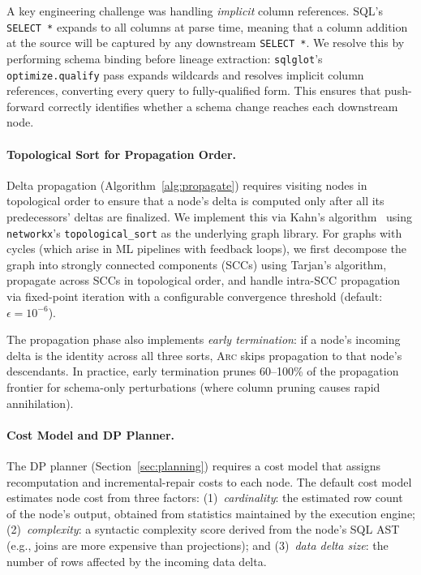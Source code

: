 \documentclass[sigplan,screen,nonacm]{acmart}
\newcommand{\arc}{\textsc{Arc}\xspace}
\begin{document}
A key engineering challenge was handling \emph{implicit} column
references.  SQL's \texttt{SELECT *} expands to all columns at parse
time, meaning that a column addition at the source will be captured by
any downstream \texttt{SELECT *}.  We resolve this by performing schema
binding before lineage extraction: \texttt{sqlglot}'s
\texttt{optimize.qualify} pass expands wildcards and resolves implicit
column references, converting every query to fully-qualified form.
This ensures that push-forward correctly identifies whether a schema
change reaches each downstream node.

\paragraph{Topological Sort for Propagation Order.}
Delta propagation (Algorithm~\ref{alg:propagate}) requires visiting
nodes in topological order to ensure that a node's delta is computed
only after all its predecessors' deltas are finalized.  We implement
this via Kahn's algorithm~\cite{kahn1962topological} using
\texttt{networkx}'s \texttt{topological\_sort} as the underlying
graph library.  For graphs with cycles (which arise in ML pipelines
with feedback loops), we first decompose the graph into strongly
connected components (SCCs) using Tarjan's algorithm, propagate
across SCCs in topological order, and handle intra-SCC propagation
via fixed-point iteration with a configurable convergence threshold
(default: $\epsilon = 10^{-6}$).

The propagation phase also implements \emph{early termination}: if a
node's incoming delta is the identity across all three sorts, \arc
skips propagation to that node's descendants.  In practice, early
termination prunes 60--100\% of the propagation frontier for
schema-only perturbations (where column pruning causes rapid
annihilation).

\paragraph{Cost Model and DP Planner.}
The DP planner (Section~\ref{sec:planning}) requires a cost model
that assigns recomputation and incremental-repair costs to each node.
The default cost model estimates node cost from three factors:
(1)~\emph{cardinality}: the estimated row count of the node's output,
obtained from statistics maintained by the execution engine;
(2)~\emph{complexity}: a syntactic complexity score derived from the
node's SQL AST (e.g., joins are more expensive than projections);
and (3)~\emph{data delta size}: the number of rows affected by the
incoming data delta.
\end{document}
